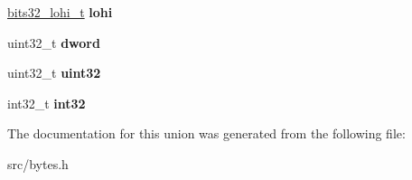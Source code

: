 \begin{DoxyCompactItemize}
\item 
\hyperlink{structbits32__lohi__s}{bits32\+\_\+lohi\+\_\+t} {\bfseries lohi}\hypertarget{unionbits32__t_ad7cf7f31700e142c10e2e60c27131d69}{}\label{unionbits32__t_ad7cf7f31700e142c10e2e60c27131d69}

\item 
uint32\+\_\+t {\bfseries dword}\hypertarget{unionbits32__t_a894d610b65f05a414d2377e9e46b1c1a}{}\label{unionbits32__t_a894d610b65f05a414d2377e9e46b1c1a}

\item 
uint32\+\_\+t {\bfseries uint32}\hypertarget{unionbits32__t_ae399904fbef319292e29946f49d6843c}{}\label{unionbits32__t_ae399904fbef319292e29946f49d6843c}

\item 
int32\+\_\+t {\bfseries int32}\hypertarget{unionbits32__t_aa272b73bd27c8d36e55668bf8d74682c}{}\label{unionbits32__t_aa272b73bd27c8d36e55668bf8d74682c}

\end{DoxyCompactItemize}


The documentation for this union was generated from the following file\+:\begin{DoxyCompactItemize}
\item 
src/bytes.\+h\end{DoxyCompactItemize}
